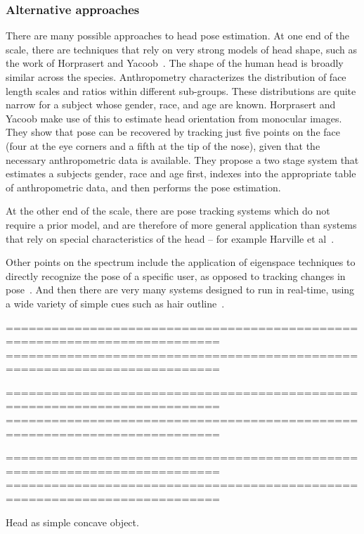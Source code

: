 \subsubsection*{Alternative approaches}

There are many possible approaches to head pose estimation.  At one
end of the scale, there are techniques that rely on very strong models
of head shape, such as the work of Horprasert and
Yacoob~\cite{black95tracking}.  The shape of the human head is broadly
similar across the species.  Anthropometry characterizes the
distribution of face length scales and ratios within different
sub-groups.  These distributions are quite narrow for a subject whose
gender, race, and age are known.  Horprasert and Yacoob make use of
this to estimate head orientation from monocular images.  They show
that pose can be recovered by tracking just five points on the face
(four at the eye corners and a fifth at the tip of the nose), given
that the necessary anthropometric data is available.  They propose a
two stage system that estimates a subjects gender, race and age first,
indexes into the appropriate table of anthropometric data, and then
performs the pose estimation.

At the other end of the scale, there are pose tracking systems which
do not require a prior model, and are therefore of more general
application than systems that rely on special characteristics of the
head -- for example Harville et al~\cite{harville99pose}.  

Other points on the spectrum include the application of eigenspace
techniques to directly recognize the pose of a specific user, as
opposed to tracking changes in pose~\cite{mckenna98realtime}.  And
then there are very many systems designed to run in real-time, using a
wide variety of simple cues such as hair outline~\cite{wang98hybrid}.




==========================================================================
==========================================================================


==========================================================================
==========================================================================


==========================================================================
==========================================================================




Head as simple concave object.

